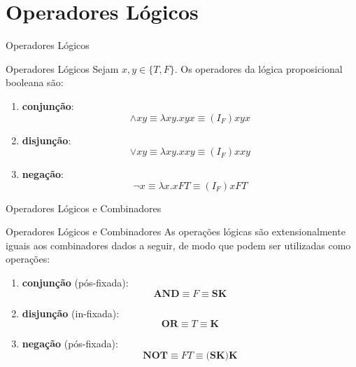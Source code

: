 \section{Operadores Lógicos}

\begin{frame}[fragile]{Operadores Lógicos}

    \begin{block}{Operadores Lógicos}
        Sejam $x, y\in\lbrace T, F\rbrace$. Os operadores da lógica proposicional booleana são:
        \begin{enumerate}
            \item \textbf{conjunção}:
            \[
                \land xy \equiv \lambda xy.xyx \equiv (I_F) xyx 
            \]

            \item \textbf{disjunção}:
            \[
                \vee xy \equiv \lambda xy.xxy \equiv (I_F) xxy 
            \]

            \item \textbf{negação}:
            \[
                \lnot x \equiv \lambda x.xFT \equiv (I_F) xFT
            \]
        \end{enumerate}
    \end{block}

\end{frame}

\begin{frame}[fragile]{Operadores Lógicos e Combinadores}

    \begin{block}{Operadores Lógicos e Combinadores}
        As operações lógicas são extensionalmente iguais aos combinadores dados a seguir,
        de modo que podem ser utilizadas como operações:
        \begin{enumerate}
            \item \textbf{conjunção} (pós-fixada):
            \[
                \mathbf{AND} \equiv F \equiv \mathbf{SK}
            \]

            \item \textbf{disjunção} (in-fixada):
            \[
                \mathbf{OR} \equiv T \equiv \mathbf{K}
            \]

            \item \textbf{negação} (pós-fixada):
            \[
                \mathbf{NOT} \equiv FT \equiv (\mathbf{SK)}\mathbf{K}
            \]
        \end{enumerate}
    \end{block}

\end{frame}

